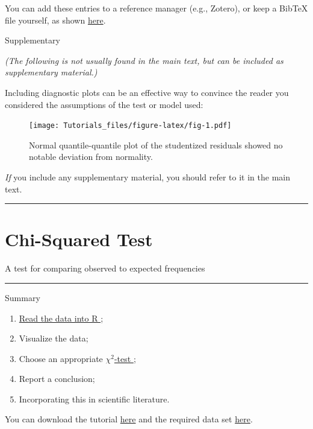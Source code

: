 \documentclass[
]{book}
\providecommand{\tightlist}{%
  \setlength{\itemsep}{0pt}\setlength{\parskip}{0pt}}
\begin{document}
You can add these entries to a reference manager (e.g., Zotero), or keep a BibTeX file yourself, as shown \href{https://youtu.be/zuuOYjE8m98}{here}.

Supplementary

\emph{(The following is not usually found in the main text, but can be included as supplementary material.)}

Including diagnostic plots can be an effective way to convince the reader you considered the assumptions of the test or model used:

\begin{figure}
\centering
\texttt{[image: Tutorials\_files/figure-latex/fig-1.pdf]}
\caption{\label{fig:fig}Normal quantile-quantile plot of the studentized residuals showed no notable deviation from normality.}
\end{figure}

\emph{If} you include any supplementary material, you should refer to it in the main text.

\begin{center}\rule{0.5\linewidth}{0.5pt}\end{center}

\hypertarget{chi-squared-test}{%
\chapter{Chi-Squared Test}\label{chi-squared-test}}

A test for comparing observed to expected frequencies

\begin{center}\rule{0.5\linewidth}{0.5pt}\end{center}

Summary

\begin{enumerate}
\def\labelenumi{\arabic{enumi}.}
\tightlist
\item
  \href{https://youtu.be/BGUqZc-Pb8w}{Read the data into R };
\item
  Visualize the data;
\item
  Choose an appropriate \href{https://youtu.be/PDl7mhpY4PI}{\(\chi^2\)-test };
\item
  Report a conclusion;
\item
  Incorporating this in scientific literature.
\end{enumerate}

You can download the tutorial \href{files/tutorial_chi-squared-test.Rmd}{here} and the required data set \href{data/binary-data.csv}{here}.
\end{document}
